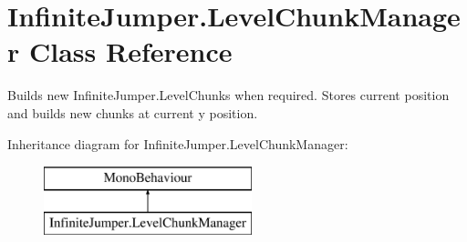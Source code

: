\hypertarget{class_infinite_jumper_1_1_level_chunk_manager}{}\section{Infinite\+Jumper.\+Level\+Chunk\+Manager Class Reference}
\label{class_infinite_jumper_1_1_level_chunk_manager}


Builds new Infinite\+Jumper.\+Level\+Chunks when required. Stores current position and builds new chunks at current y position.  


Inheritance diagram for Infinite\+Jumper.\+Level\+Chunk\+Manager\+:\begin{figure}[H]
\begin{center}
\leavevmode
\includegraphics[height=2.000000cm]{class_infinite_jumper_1_1_level_chunk_manager}
\end{center}
\end{figure}
